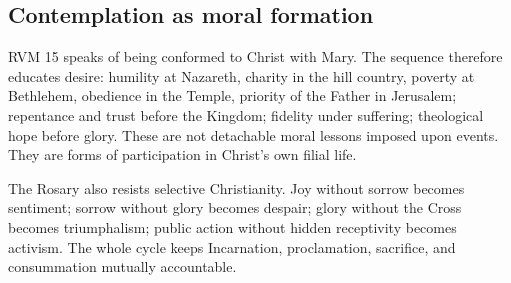 \subsection{Contemplation as moral formation}

RVM 15 speaks of being conformed to Christ with Mary. The sequence therefore educates desire: humility at Nazareth, charity in the hill country, poverty at Bethlehem, obedience in the Temple, priority of the Father in Jerusalem; repentance and trust before the Kingdom; fidelity under suffering; theological hope before glory. These are not detachable moral lessons imposed upon events. They are forms of participation in Christ's own filial life.

The Rosary also resists selective Christianity. Joy without sorrow becomes sentiment; sorrow without glory becomes despair; glory without the Cross becomes triumphalism; public action without hidden receptivity becomes activism. The whole cycle keeps Incarnation, proclamation, sacrifice, and consummation mutually accountable.
